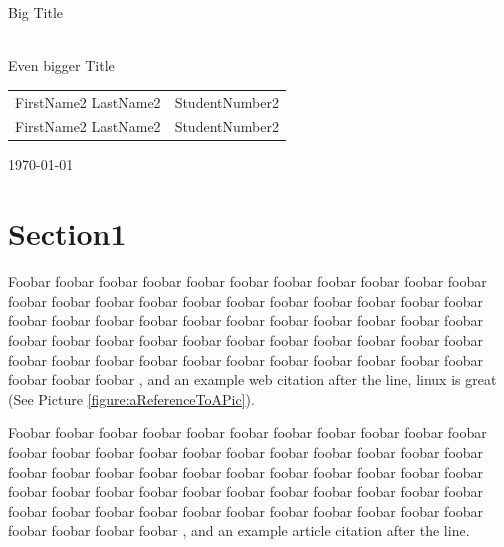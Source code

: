 \documentclass[a4paper,11pt]{article}
\begin{document}
\begin{titlepage}
\pagestyle{empty}

\vspace{5cm}
\begin{Large}
\noindent
Big Title
\end{Large}
\vspace{3cm}
\begin{LARGE}
\noindent\\
Even bigger Title
\end{LARGE}

\vspace{12cm}
\begin{large}
\noindent
\begin{tabular}{@{}ll}
FirstName2 LastName2 & StudentNumber2\\
FirstName2 LastName2 & StudentNumber2\\
\end{tabular}
\end{large}

\vspace{2cm}
\noindent
\today

\end{titlepage}

\tableofcontents
\newpage

\clearpage

\section{Section1}

Foobar foobar foobar foobar foobar foobar foobar foobar foobar foobar foobar foobar foobar foobar foobar foobar foobar foobar foobar foobar foobar foobar foobar foobar foobar foobar foobar foobar foobar foobar foobar foobar foobar foobar foobar foobar foobar foobar foobar foobar foobar foobar foobar foobar foobar foobar foobar foobar foobar foobar foobar foobar foobar foobar foobar foobar foobar foobar , and an example web citation after the line, linux is great (See Picture \ref{figure:aReferenceToAPic}). \cite{web:ExampleWebCitation}

Foobar foobar foobar foobar foobar foobar foobar foobar foobar foobar foobar foobar foobar foobar foobar foobar foobar foobar foobar foobar foobar foobar foobar foobar foobar foobar foobar foobar foobar foobar foobar foobar foobar foobar foobar foobar foobar foobar foobar foobar foobar foobar foobar foobar foobar foobar foobar foobar foobar foobar foobar foobar foobar foobar foobar foobar foobar foobar foobar , and an example article citation after the line. \cite{ExampleArticleCitation}
\end{document}
